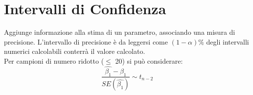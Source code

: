 \section{Intervalli di Confidenza}
Aggiunge informazione alla stima di un parametro, associando una misura di 
precisione. L'intervallo di precisione \`e da leggersi come $(1-\alpha) \% $ 
degli intervalli numerici calcolabili conterr\`a il valore calcolato.\\
Per campioni di numero ridotto ($\le$ 20) si pu\`o considerare:
\[ \frac{\hat{\beta_1} - \beta_1}{SE(\hat{\beta_1})} \sim t_{n-2} \]